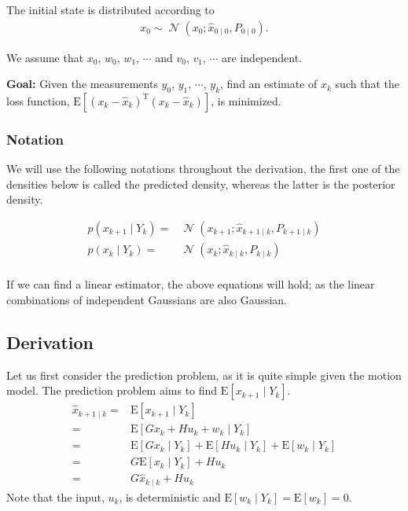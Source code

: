 \documentclass[twoside]{article}
\newcommand{\N}{\operatorname{\mathcal{N}}}
\renewcommand{\t}{^\mathrm{T}{}}
\newcommand{\E}{\mathrm{E}{}}
\renewcommand{\k}{_k{}}
\newcommand{\kp}{_{k+1}{}}
\newcommand{\kpk}{_{k+1\mid k}{}}
\newcommand{\kk}{_{k\mid k}{}}
\begin{document}
The initial state is distributed according to
\begin{align*}
	x_0 \sim \N(x_0;\hat x_{0\mid0},P_{0\mid0}).
\end{align*}

We assume that $x_0$, $w_0$,  $w_1$,  $\cdots$ and $v_0$, $v_1$, $\cdots$ are  independent.

\textbf{Goal:} Given the measurements $y_0$, $y_1$, $\cdots$, $y_k$, find an estimate of $x\k$ such that the loss function, $\E\left[(x\k-\hat x\k)\t(x\k-\hat x\k) \right] $, is minimized.

\subsubsection*{Notation}
We will use the following notations throughout the derivation, the first one of the densities below is called the predicted density, whereas the latter is the posterior density.

\begin{align*}
	p(x\kp\mid Y\k) =& \N(x\kp; \hat x\kpk,P\kpk)\\
	p(x\k\mid Y\k) =& \N(x\k; \hat x\kk,P\kk)\\
\end{align*}
\begin{tcolorbox} [colback=blue!5!white,colframe=blue!75!black,title=\textbf{Remark}:,subtitle style={boxrule=0.4pt,
		colback=yellow!50!red!25!white}]
	If we can find a linear estimator, the above equations will hold; as the linear combinations of independent Gaussians are also Gaussian.
\end{tcolorbox}

\subsection*{Derivation}

Let us first consider the prediction problem, as it is quite simple given the motion model. The prediction problem aims to find $\E\left[x\kp \mid Y\k \right] $. 
\begin{align*}
	\hat{x}\kpk =& \E\left[x\kp \mid Y\k \right]\\
	 =& \E\left[G x\k + H u\k + w\k \mid Y\k \right]\\
	=& \E\left[G x\k \mid Y\k \right] + \E\left[H u\k \mid Y\k \right] + \E\left[w\k \mid Y\k \right]\\
	=& G\E\left[x\k \mid Y\k \right] + H u\k \\
	=& G \hat x\kk + H u\k
\end{align*} 
Note that the input, $u\k$, is deterministic and $\E\left[w\k \mid Y\k \right]=\E\left[w\k \right]=0 $.
\end{document}
